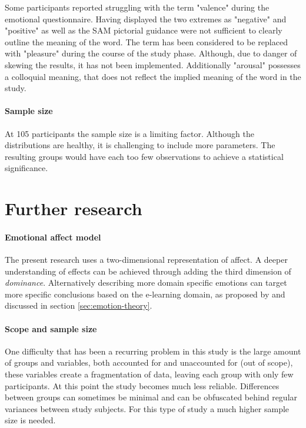 	Some participants reported struggling with the term "valence" during the emotional questionnaire. Having displayed the two extremes as "negative" and "positive" as well as the SAM pictorial guidance were not sufficient to clearly outline the meaning of the word. The term has been considered to be replaced with "pleasure" during the course of the study phase. Although, due to danger of skewing the results, it has not been implemented. Additionally "arousal" possesses a colloquial meaning, that does not reflect the implied meaning of the word in the study.
	

		
	\paragraph{Sample size} At 105 participants the sample size is a limiting factor. Although the distributions are healthy, it is challenging to include more parameters. The resulting groups would have each too few observations to achieve a statistical significance.

\section{Further research} \label{sec:further-research}

\paragraph{Emotional affect model} The present research uses a two-dimensional representation of affect. A deeper understanding of effects can be achieved through adding the third dimension of \textit{dominance}. Alternatively describing more domain specific emotions can target more specific conclusions based on the e-learning domain, as proposed by \cite{SreejaPSMahalakshmi2017} and discussed in section \ref{sec:emotion-theory}.

\paragraph{Scope and sample size}
One difficulty that has been a recurring problem in this study is the large amount of groups and variables, both accounted for and unaccounted for (out of scope), these variables create a fragmentation of data, leaving each group with only few participants. At this point the study becomes much less reliable. Differences between groups can sometimes be minimal and can be obfuscated behind regular variances between study subjects. For this type of study a much higher sample size is needed.

